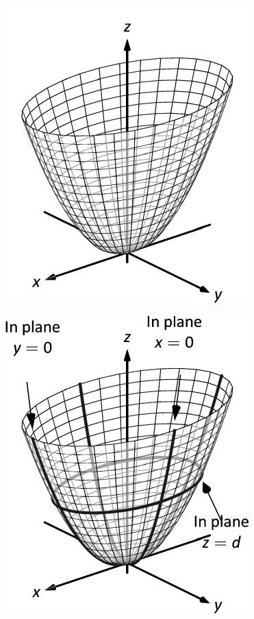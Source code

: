 \documentclass[10pt]{article}
\begin{document}
\includegraphics{figquadric_par_3DBW.pdf}
\texttt{}

\includegraphics{figquadric_parb_3DBW.pdf}
\texttt{}
\end{document}
